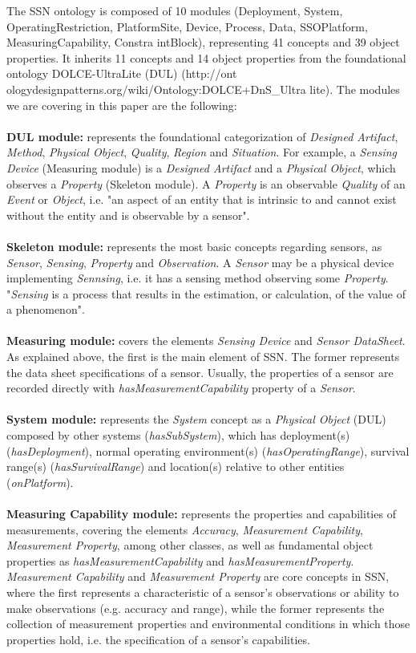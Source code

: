 \documentclass{sig-alternate-05-2015}
\begin{document}
The SSN ontology is composed of 10 modules (Deployment, System, OperatingRestriction, PlatformSite, Device, Process, Data, SSOPlatform, MeasuringCapability, Constra intBlock), representing 41 concepts and 39 object properties. It inherits 11 concepts and 14 object properties from the foundational ontology DOLCE-UltraLite (DUL) (http://ont ologydesignpatterns.org/wiki/Ontology:DOLCE+DnS\_Ultra lite). The modules we are covering in this paper are the following:
\\\\\textbf{DUL module:} represents the foundational categorization of \textit{Designed Artifact}, \textit{Method}, \textit{Physical Object}, \textit{Quality}, \textit{Region} and \textit{Situation}. For example, a \textit{Sensing Device} (Measuring module) is a \textit{Designed Artifact} and a \textit{Physical Object}, which observes a \textit{Property} (Skeleton module). A \textit{Property} is an observable \textit{Quality} of an \textit{Event} or \textit{Object}, i.e. "an aspect of an entity that is intrinsic to and cannot exist without the entity and is observable by a sensor". 
\\\\\textbf{Skeleton module:} represents the most basic concepts regarding sensors, as \textit{Sensor}, \textit{Sensing}, \textit{Property} and  \textit{Observation}. A \textit{Sensor} may be a physical device implementing \textit{Sennsing}, i.e. it has a sensing method observing some \textit{Property}. "\textit{Sensing} is a process that results in the estimation, or calculation, of the value of a phenomenon". 
\\\\\textbf{Measuring module:} covers the elements \textit{Sensing Device} and \textit{Sensor DataSheet}. As explained above, the first is the main element of SSN. The former represents the data sheet specifications of a sensor. Usually, the properties of a sensor are recorded directly with \textit{hasMeasurementCapability} property of a \textit{Sensor}.
\\\\\textbf{System module:} represents the \textit{System} concept as a \textit{Physical Object} (DUL) composed by other systems (\textit{hasSubSystem}), which has deployment(s) (\textit{hasDeployment}), normal operating environment(s) (\textit{hasOperatingRange}), survival range(s) (\textit{hasSurvivalRange}) and location(s) relative to other entities (\textit{onPlatform}).
\\\\\textbf{Measuring Capability module:} represents the properties and capabilities of measurements, covering the elements \textit{Accuracy}, \textit{Measurement Capability}, \textit{Measurement Property}, among other classes, as well as fundamental object properties as \textit{hasMeasurementCapability} and \textit{hasMeasurementProperty}. \textit{Measurement Capability} and \textit{Measurement Property} are core concepts in SSN, where the first represents a characteristic of a sensor's observations or ability to make observations (e.g. accuracy and range), while the former represents the collection of measurement properties and environmental conditions in which those properties hold, i.e. the specification of a sensor's capabilities. 
\end{document}
